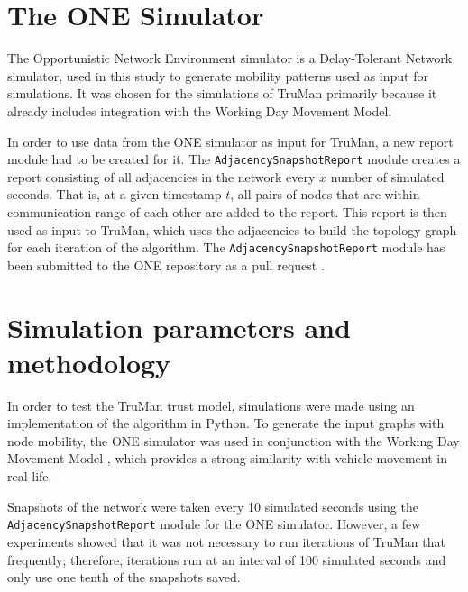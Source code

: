 \section{The ONE Simulator}
\label{section:theone}
The Opportunistic Network Environment simulator \cite{keranen2009one} \cite{onerepo} is a Delay-Tolerant Network simulator, used in this study to generate mobility patterns used as input for simulations.
It was chosen for the simulations of TruMan primarily because it already includes integration with the Working Day Movement Model.

In order to use data from the ONE simulator as input for TruMan, a new report module had to be created for it.
The \texttt{AdjacencySnapshotReport} module creates a report consisting of all adjacencies in the network every $x$ number of simulated seconds.
That is, at a given timestamp $t$, all pairs of nodes that are within communication range of each other are added to the report.
This report is then used as input to TruMan, which uses the adjacencies to build the topology graph for each iteration of the algorithm.
The \texttt{AdjacencySnapshotReport} module has been submitted to the ONE repository as a pull request \cite{adjacencypull}.


\section{Simulation parameters and methodology}
\label{section:parameters}

In order to test the TruMan trust model, simulations were made using an implementation of the algorithm in Python.
To generate the input graphs with node mobility, the ONE simulator \cite{keranen2009one} was used in conjunction with the Working Day Movement Model \cite{ekman2008working}, which provides a strong similarity with vehicle movement in real life.

Snapshots of the network were taken every 10 simulated seconds using the \texttt{AdjacencySnapshotReport} module for the ONE simulator.
However, a few experiments showed that it was not necessary to run iterations of TruMan that frequently; therefore, iterations run at an interval of 100 simulated seconds and only use one tenth of the snapshots saved.

